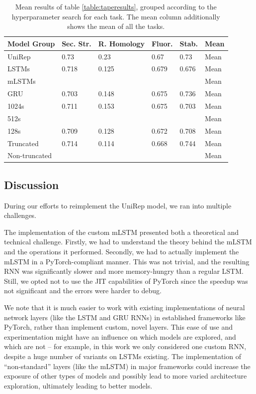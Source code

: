 \documentclass[a4paper,12pt]{article}
\begin{document}
\begin{table}[H]
\centering
{}
\begin{tabularx}{\linewidth}{Llllll}
\toprule
\textbf{Model Group} & \textbf{Sec. Str.} & \textbf{R. Homology} & \textbf{Fluor.} & \textbf{Stab.} & \textbf{Mean} \\ \hline
UniRep        & 0.73   & 0.23  & 0.67  & 0.73  & Mean \\
LSTMs         & 0.718  & 0.125 & 0.679 & 0.676 & Mean \\
mLSTMs        &        &       &       &       & Mean \\
GRU           & 0.703  & 0.148 & 0.675 & 0.736 & Mean \\
1024s         & 0.711  & 0.153 & 0.675 & 0.703 & Mean \\
512s          &        &       &       &       & Mean \\
128s          & 0.709  & 0.128 & 0.672 & 0.708 & Mean \\
Truncated     & 0.714  & 0.114 & 0.668 & 0.744 & Mean \\
Non-truncated &        &       &       &       & Mean \\ \bottomrule
\end{tabularx}
\caption{Mean results of table \ref{table:taperesults}, grouped according to the hyperparameter search for each task. The mean column additionally shows the mean of all the tasks.}
\label{table:taperesults_mean}
\end{table}

\subsection{Discussion}
\label{section:reproduction_challenges}
During our efforts to reimplement the UniRep model, we ran into multiple challenges.

The implementation of the custom mLSTM presented both a theoretical and technical challenge. Firstly, we had to understand the theory behind the mLSTM and the operations it performed. Secondly, we had to actually implement the mLSTM in a PyTorch-compliant manner. This was not trivial, and the resulting RNN was significantly slower and more memory-hungry than a regular LSTM. Still, we opted not to use the JIT capabilities of PyTorch since the speedup was not significant and the errors were harder to debug.

We note that it is much easier to work with existing implementations of neural network layers (like the LSTM and GRU RNNs) in established frameworks like PyTorch, rather than implement custom, novel layers. This ease of use and experimentation might have an influence on which models are explored, and which are not -- for example, in this work we only considered one custom RNN, despite a huge number of variants on LSTMs existing. The implementation of ``non-standard'' layers (like the mLSTM) in major frameworks could increase the exposure of other types of models and possibly lead to more varied architecture exploration, ultimately leading to better models.
\end{document}

